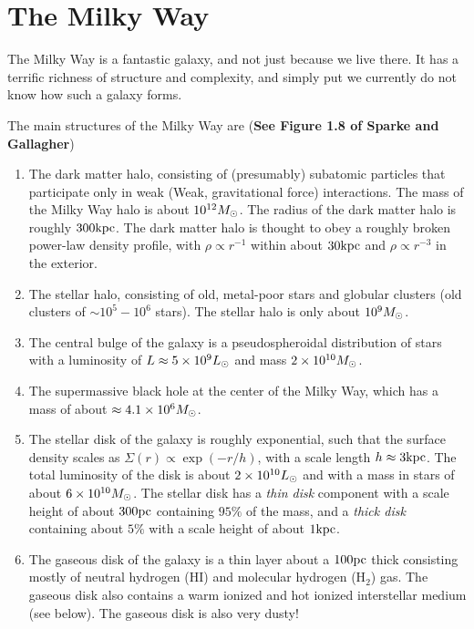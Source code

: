 \documentclass[12pt]{article}
\begin{document}
\section{The Milky Way}

The Milky Way is a fantastic galaxy, and not just because we live there.
It has a terrific richness of structure and complexity, and simply put we
currently do not know how such a galaxy forms.

The main structures of the Milky Way are ({\bf See Figure 1.8 of Sparke and Gallagher})

\begin{enumerate}


\item The dark matter halo, consisting of (presumably) subatomic particles that
participate only in weak (Weak, gravitational force) interactions. The mass of
the Milky Way halo is about $10^{12}M_{\odot}$. The radius of the dark matter halo
is roughly $300\mathrm{kpc}$. The dark matter halo is thought to obey a roughly broken
power-law density profile, with $\rho\propto r^{-1}$ within about $30\mathrm{kpc}$ and
$\rho\propto r^{-3}$ in the exterior.

\item The stellar halo, consisting of old, metal-poor stars and globular clusters
(old clusters of $\sim10^{5}-10^{6}$ stars). The stellar halo is only about
$10^{9}M_{\odot}$.

\item The central bulge of the galaxy is a pseudospheroidal distribution of
stars with a luminosity of $L\approx 5\times 10^{9}L_{\odot}$ 
and mass $2\times10^{10}M_{\odot}$.

\item The supermassive black hole at the center of the Milky Way, which has a
mass of about $\approx4.1\times10^{6}M_{\odot}$.

\item The stellar disk of the galaxy is roughly exponential, such that
the surface density scales as $\Sigma(r) \propto \exp(-r/h)$, 
with a scale length $h\approx3\mathrm{kpc}$. The total luminosity of the disk
is about $2\times10^{10}L_{\odot}$ and with a mass in stars of
about $6\times10^{10}M_{\odot}$. The stellar disk has a {\it thin disk} 
component with
a scale height of about $300\mathrm{pc}$ containing $95\%$ of the mass, and a
{\it thick disk} containing about $5\%$ with a scale height of about $1\mathrm{kpc}$.

\item The gaseous disk of the galaxy is a thin layer about a $100\mathrm{pc}$ thick
consisting mostly of neutral hydrogen (HI) and molecular hydrogen (H$_2$) gas.
The gaseous disk also contains a warm ionized and hot ionized interstellar medium
(see below).
The gaseous disk is also very dusty!

\end{enumerate}
\end{document}
